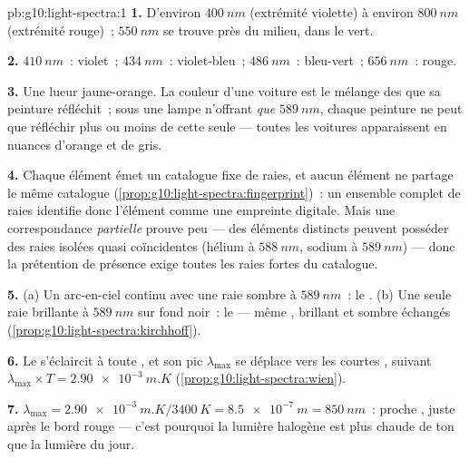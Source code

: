 \begin{solution}{pb:g10:light-spectra:1}
\textbf{1.} D'environ $\qty{400}{nm}$ (extrémité violette) à environ
$\qty{800}{nm}$ (extrémité rouge)~; $\qty{550}{nm}$ se trouve près du
milieu, dans le vert.

\textbf{2.} $\qty{410}{nm}$~: violet~; $\qty{434}{nm}$~: violet-bleu~;
$\qty{486}{nm}$~: bleu-vert~; $\qty{656}{nm}$~: rouge.

\textbf{3.} Une lueur  jaune-orange. La couleur d'une
voiture est le mélange des  que sa peinture
réfléchit~; sous une lampe n'offrant \emph{que} $\qty{589}{nm}$, chaque
peinture ne peut que réfléchir plus ou moins de cette seule
 --- toutes les voitures apparaissent en nuances
d'orange et de gris.

\textbf{4.} Chaque élément émet un catalogue fixe de raies, et aucun
élément ne partage le même catalogue
(\cref{prop:g10:light-spectra:fingerprint})~: un ensemble complet de
raies identifie donc l'élément comme une empreinte digitale. Mais une
correspondance \emph{partielle} prouve peu --- des éléments distincts
peuvent posséder des raies isolées quasi coïncidentes (hélium à
$\qty{588}{nm}$, sodium à $\qty{589}{nm}$) --- donc la prétention de
présence exige toutes les raies fortes du catalogue.

\textbf{5.} (a) Un arc-en-ciel continu avec une raie sombre à
$\qty{589}{nm}$~: le . (b) Une seule raie
brillante à $\qty{589}{nm}$ sur fond noir~: le 
--- même , brillant et sombre échangés
(\cref{prop:g10:light-spectra:kirchhoff}).

\textbf{6.} Le  s'éclaircit à toute , et son
pic $\lambda_{\max}$ se déplace vers les courtes ,
suivant $\lambda_{\max} \times T = \qty{2.90e-3}{m.K}$
(\cref{prop:g10:light-spectra:wien}).

\textbf{7.} $\lambda_{\max} = \qty{2.90e-3}{m.K} / \qty{3400}{K}
= \qty{8.5e-7}{m} = \qty{850}{nm}$~: proche , juste
après le bord rouge --- c'est pourquoi la lumière halogène est plus
chaude de ton que la lumière du jour.


\end{solution}
